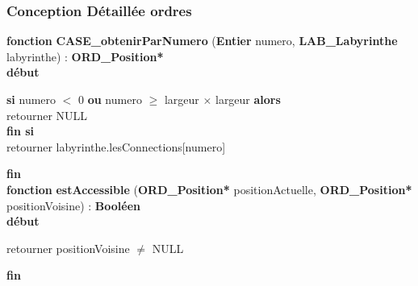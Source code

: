 \subsubsection{Conception Détaillée ordres}

\noindent\textbf{fonction} \textbf{CASE\_obtenirParNumero} (\textbf{Entier} numero, \textbf{LAB\_Labyrinthe} labyrinthe) : \textbf{ORD\_Position*}\\
\textbf{début}
\begin{flushleft}
    \hspace*{1cm}\textbf{si} numero $<$ 0 \textbf{ou} numero $\geq$ largeur $\times$ largeur \textbf{alors}\\
    \hspace*{2cm}retourner NULL\\
    \hspace*{1cm}\textbf{fin si}\\
    \hspace*{1cm}retourner labyrinthe.lesConnections[numero]
\end{flushleft}
\textbf{fin}\\

\noindent\textbf{fonction} \textbf{estAccessible} (\textbf{ORD\_Position*} positionActuelle, \textbf{ORD\_Position*} positionVoisine) : \textbf{Booléen}\\
\textbf{début}
\begin{flushleft}
    \hspace*{1cm}retourner positionVoisine $\neq$ NULL
\end{flushleft}
\textbf{fin}\\

